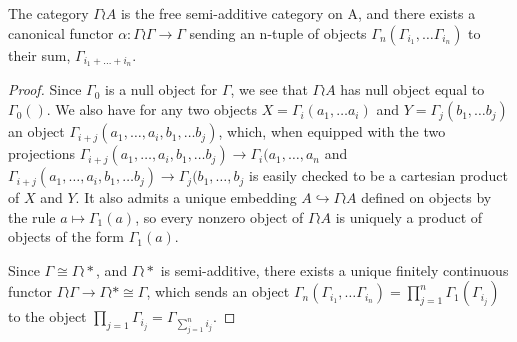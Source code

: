 \begin{prop}The category \(\Gamma\wr A\) is the free semi-additive category on A, and there exists a canonical functor \(\alpha:\Gamma\wr\Gamma \to \Gamma\) sending an n-tuple of objects \(\Gamma_n(\Gamma_{i_1},\dots \Gamma_{i_n})\) to their sum, \(\Gamma_{i_1+\dots+i_n}\).  
\end{prop}
\begin{proof} 
Since \(\Gamma_0\) is a null object for \(\Gamma\), we see that \(\Gamma\wr A\) has null object equal to \(\Gamma_0()\).  We also have for any two objects \(X=\Gamma_i(a_1,\dots a_i)\) and \(Y=\Gamma_j(b_1,\dots b_j)\) an object \(\Gamma_{i+j}(a_1,\dots,a_i,b_1,\dots b_j)\), which, when equipped with the two projections \(\Gamma_{i+j}(a_1,\dots,a_i,b_1,\dots b_j)\to \Gamma_i(a_1,\dots,a_n\) and \(\Gamma_{i+j}(a_1,\dots,a_i,b_1,\dots b_j)\to \Gamma_j(b_1,\dots,b_j\) is easily checked to be a cartesian product of \(X\) and \(Y\).  It also admits a unique embedding \(A\hookrightarrow \Gamma\wr A\) defined on objects by the rule \(a\mapsto \Gamma_1(a)\), so every nonzero object of \(\Gamma\wr A\) is uniquely a product of objects of the form \(\Gamma_1(a)\). 

Since \(\Gamma\cong \Gamma\wr \ast\), and \(\Gamma\wr \ast\) is semi-additive, there exists a unique finitely continuous functor \(\Gamma\wr \Gamma\to\Gamma\wr \ast \cong \Gamma\), which sends an object 
\(\Gamma_n(\Gamma_{i_1},\dots \Gamma_{i_n}) = \prod_{j=1}^n\Gamma_1(\Gamma_{i_j})\) 
to the object \(\prod_{j=1}\Gamma_{i_j}=\Gamma_{\sum_{j=1}^n i_j}\).  
\end{proof}


